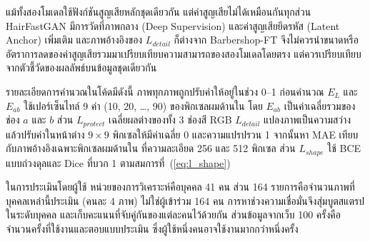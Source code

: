 แม้ทั้งสองโมเดลใช้ฟังก์ชันสูญเสียหลักชุดเดียวกัน แต่ค่าสูญเสียไม่ได้เหมือนกันทุกส่วน
HairFastGAN มีการวัดที่ภาพกลาง (Deep Supervision) และค่าสูญเสียยึดรหัส (Latent Anchor) เพิ่มเติม
และภาพอ้างอิงของ $L_{detail}$ ก็ต่างจาก Barbershop-FT
จึงไม่ควรนำขนาดหรืออัตราการลดของค่าสูญเสียรวมมาเปรียบเทียบความสามารถของสองโมเดลโดยตรง
แต่ควรเปรียบเทียบจากตัวชี้วัดของผลลัพธ์บนข้อมูลชุดเดียวกัน

รายละเอียดการคำนวณในโค้ดมีดังนี้ ภาพทุกภาพถูกปรับค่าให้อยู่ในช่วง 0--1 ก่อนคำนวณ
$E_L$ และ $E_{ab}$ ใช้เปอร์เซ็นไทล์ 9 ค่า (10, 20, \ldots, 90) ของพิกเซลผมด้านใน
โดย $E_{ab}$ เป็นค่าเฉลี่ยรวมของช่อง $a$ และ $b$
ส่วน $L_{protect}$ เฉลี่ยผลต่างของทั้ง 3 ช่องสี RGB
$L_{detail}$ แปลงภาพเป็นความสว่าง แล้วปรับค่าในหน้าต่าง $9 \times 9$ พิกเซลให้มีค่าเฉลี่ย 0 และความแปรปรวน 1
จากนั้นหา MAE เทียบกับภาพอ้างอิงเฉพาะพิกเซลผมด้านใน ที่ความละเอียด 256 และ 512 พิกเซล
ส่วน $L_{shape}$ ใช้ BCE แบบถ่วงดุลและ Dice ที่บวก 1 ตามสมการที่~(\ref{eq:l_shape})

ในการประเมินโดยผู้ใช้ หน่วยของการวิเคราะห์คือบุคคล 41 คน
ส่วน 164 รายการคือจำนวนภาพที่บุคคลเหล่านี้ประเมิน (คนละ 4 ภาพ) ไม่ใช่ผู้เข้าร่วม 164 คน
การหาช่วงความเชื่อมั่นจึงสุ่มบูตสแตรปในระดับบุคคล และเก็บคะแนนที่จับคู่กันของแต่ละคนไว้ด้วยกัน
ส่วนข้อมูลจากเว็บ 100 ครั้งคือจำนวนครั้งที่ใช้งานและตอบแบบประเมิน ซึ่งผู้ใช้หนึ่งคนอาจใช้งานมากกว่าหนึ่งครั้ง
